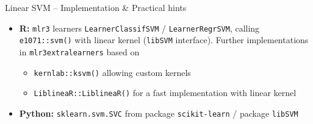 \begin{frame}{Linear SVM -- Implementation \& Practical hints}
\begin{itemize}
  \item \textbf{R:} \texttt{mlr3} learners \texttt{LearnerClassifSVM} /
  \texttt{LearnerRegrSVM}, calling \texttt{e1071::svm()} with linear kernel (\texttt{libSVM} interface).
  Further implementations in \texttt{mlr3extralearners} based on
  \begin{itemize}
      \item \texttt{kernlab::ksvm()} allowing custom kernels
      \item \texttt{LiblineaR::LiblineaR()} for a fast implementation with linear kernel
  \end{itemize}
  \item \textbf{Python:} \texttt{sklearn.svm.SVC} from package 
  \texttt{scikit-learn} / package \texttt{libSVM}
\end{itemize}

\end{frame}








